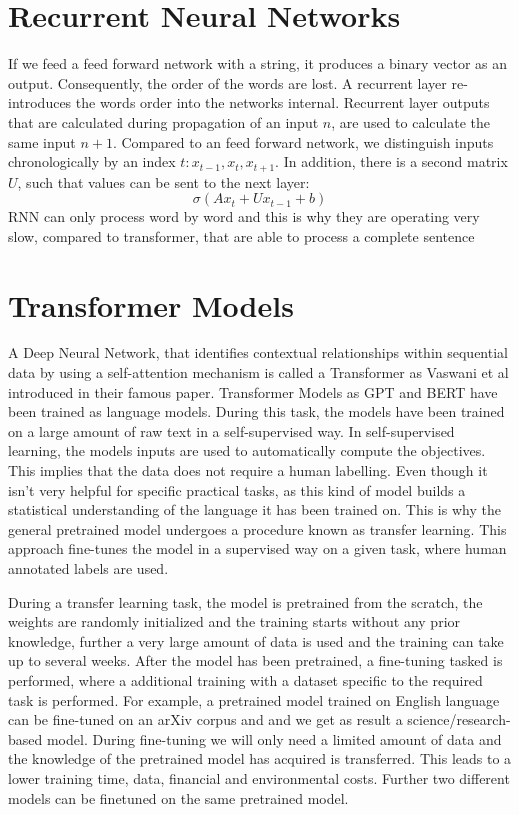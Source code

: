 
\section{Recurrent Neural Networks}
If we feed a feed forward network with a string, it produces a binary vector as an output.
Consequently, the order of the words are lost.
A recurrent layer re-introduces the words order into the networks internal.
Recurrent layer outputs that are calculated during propagation of an input $n$, are used to calculate the same input $n+1$. 
Compared to an feed forward network, we distinguish inputs chronologically by an index $t: x_{t-1},x_t, x_{t+1}$.
In addition, there is a second matrix $U$, such that values can be sent to the next layer:
\begin{equation}
    \sigma(Ax_t+Ux_{t-1}+b)
\end{equation}
\cite{haralambous_course_2024}
\ac{RNN} can only process word by word and this is why they are operating very slow, compared to transformer, that are able to process a complete sentence 

\section{Transformer Models}
A Deep Neural Network, that identifies contextual relationships within sequential data by using a self-attention mechanism is called a Transformer as Vaswani et al \cite{vaswani_attention_2023} introduced in their famous paper.
Transformer Models as GPT and BERT have been trained as language models.
During this task, the models have been trained on a large amount of raw text in a self-supervised way.
In self-supervised learning, the models inputs are used to automatically compute the objectives.
This implies that the data does not require a human labelling.
Even though it isn't very helpful for specific practical tasks, as this kind of model builds a statistical understanding of the language it has been trained on.
This is why the general pretrained model undergoes a procedure known as transfer learning.
This approach fine-tunes the model in a supervised way on a given task, where human annotated labels are used.\cite{Huggingface}

During a transfer learning task, the model is pretrained from the scratch, the weights are randomly initialized and the training starts without any prior knowledge, further a very large amount of data is used and the training can take up to several weeks.
After the model has been pretrained, a fine-tuning tasked is performed, where a additional training with a dataset specific to the required task is performed.
For example, a pretrained model trained on English language can be fine-tuned on an arXiv corpus and and we get as result a science/research-based model.
During fine-tuning we will only need a limited amount of data and the knowledge of the pretrained model has acquired is transferred.
This leads to a lower training time, data, financial and environmental costs.
Further two different models can be finetuned on the same pretrained model.

